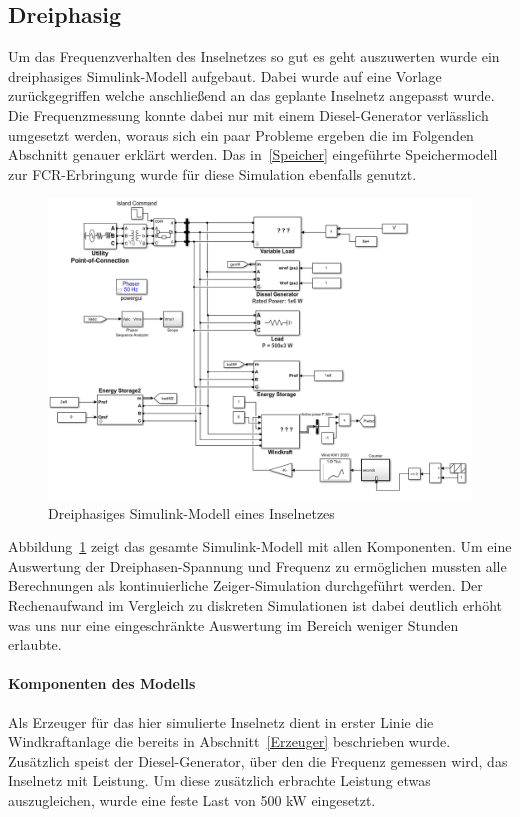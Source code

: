 \subsection{Dreiphasig}\label{3phase}
Um das Frequenzverhalten des Inselnetzes so gut es geht auszuwerten wurde ein dreiphasiges Simulink-Modell aufgebaut.
Dabei wurde auf eine Vorlage zurückgegriffen welche anschließend an das geplante Inselnetz angepasst wurde.
Die Frequenzmessung konnte dabei nur mit einem Diesel-Generator verlässlich umgesetzt werden, woraus sich ein paar Probleme ergeben
die im Folgenden Abschnitt genauer erklärt werden.
Das in~\ref{Speicher} eingeführte Speichermodell zur FCR-Erbringung wurde für diese Simulation ebenfalls genutzt.

\begin{figure}[h!]
	\centering
	\includegraphics[width=14cm]{Abbildungen/Dreiphasig.png}
	\caption{Dreiphasiges Simulink-Modell eines Inselnetzes}\label{Mod:3phase}
\end{figure}

Abbildung~\ref{Mod:3phase} zeigt das gesamte Simulink-Modell mit allen Komponenten.
Um eine Auswertung der Dreiphasen-Spannung und Frequenz zu ermöglichen mussten alle Berechnungen als kontinuierliche Zeiger-Simulation 
durchgeführt werden.
Der Rechenaufwand im Vergleich zu diskreten Simulationen ist dabei deutlich erhöht was uns nur eine eingeschränkte
Auswertung im Bereich weniger Stunden erlaubte.

\paragraph{Komponenten des Modells}
Als Erzeuger für das hier simulierte Inselnetz dient in erster Linie die Windkraftanlage die bereits in Abschnitt~\ref{Erzeuger} beschrieben wurde.
Zusätzlich speist der Diesel-Generator, über den die Frequenz gemessen wird, das Inselnetz mit Leistung.
Um diese zusätzlich erbrachte Leistung etwas auszugleichen, wurde eine feste Last von 500 kW eingesetzt.

